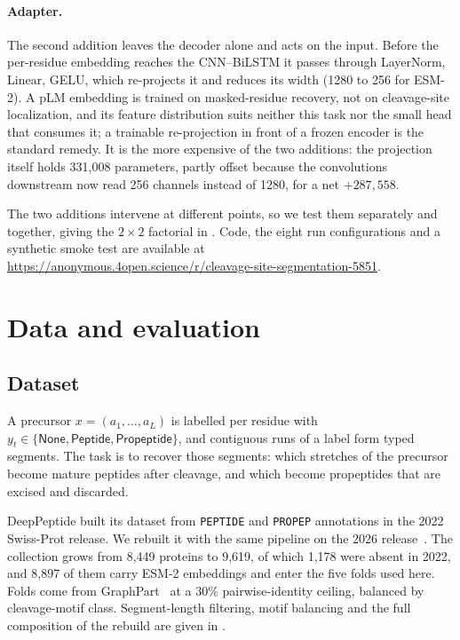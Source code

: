 \documentclass{article}
\begin{document}
\paragraph{Adapter.} The second addition leaves the decoder alone and acts on the input. Before the per-residue embedding reaches the CNN--BiLSTM it passes through LayerNorm, Linear, GELU, which re-projects it and reduces its width (1280 to 256 for ESM-2). A pLM embedding is trained on masked-residue recovery, not on cleavage-site localization, and its feature distribution suits neither this task nor the small head that consumes it; a trainable re-projection in front of a frozen encoder is the standard remedy. It is the more expensive of the two additions: the projection itself holds 331{,}008 parameters, partly offset because the convolutions downstream now read 256 channels instead of 1280, for a net $+287{,}558$.

The two additions intervene at different points, so we test them separately and together, giving the $2\times2$ factorial in . Code, the eight run configurations and a synthetic smoke test are available at \url{https://anonymous.4open.science/r/cleavage-site-segmentation-5851}.

\section{Data and evaluation}
\label{sec:eval}

\subsection{Dataset}
\label{sec:dataset}
A precursor $x=(a_1,\dots,a_L)$ is labelled per residue with $y_t \in \{\textsf{None},\textsf{Peptide},\textsf{Propeptide}\}$, and contiguous runs of a label form typed segments. The task is to recover those segments: which stretches of the precursor become mature peptides after cleavage, and which become propeptides that are excised and discarded.


DeepPeptide built its dataset from \texttt{PEPTIDE} and \texttt{PROPEP} annotations in the 2022 Swiss-Prot release. We rebuilt it with the same pipeline on the 2026 release~\citep{uniprot2025}. The collection grows from 8{,}449 proteins to 9{,}619, of which 1{,}178 were absent in 2022, and 8{,}897 of them carry ESM-2 embeddings and enter the five folds used here. Folds come from GraphPart~\citep{graphpart2023} at a 30\% pairwise-identity ceiling, balanced by cleavage-motif class. Segment-length filtering, motif balancing and the full composition of the rebuild are given in .
\end{document}
